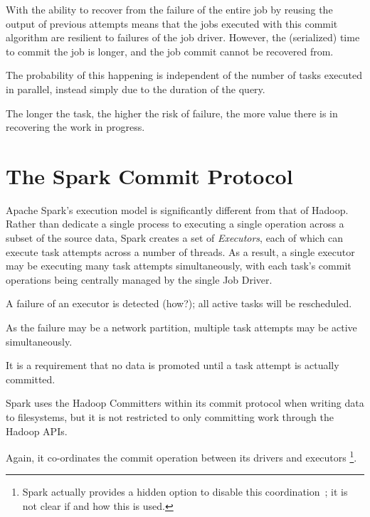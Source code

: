\documentclass[conference]{IEEEtran}
\begin{document}
With the ability to recover from the failure of the entire job by
reusing the output of previous attempts means that the jobs executed
with this commit algorithm are resilient to failures of the job driver.
However, the (serialized) time to commit the job is longer, and the job
commit cannot be recovered from.


The probability of this happening is independent of the number
of tasks executed in parallel, instead simply due to the duration of the query.

The longer the task, the higher the risk of failure, the more value there is
in recovering the work in progress.




\section{The Spark Commit Protocol}
\label{sec:theSparkCommitProtocol}

Apache Spark's execution model is significantly different from
that of Hadoop.
Rather than dedicate a single process to executing a single operation
across a subset of the source data, Spark creates a set of \emph{Executors},
each of which can execute task attempts across a number of threads.
As a result, a single executor may be executing many task attempts
simultaneously, with each task's commit operations being centrally managed
by the single Job Driver.


A failure of an executor is detected (how?);
all active tasks will be rescheduled.

As the failure may be a network partition, multiple task attempts may be active
simultaneously.

It is a requirement that no data is promoted until a task attempt is actually
committed.


Spark uses the Hadoop Committers within its commit protocol when
writing data to filesystems, but it is not restricted to only committing work
through the Hadoop APIs.

Again, it co-ordinates the commit operation between its drivers and executors
\footnote{Spark actually provides a hidden option to disable this
coordination\ \cite{SPARK-8029}; it is not clear if and how this is used.}.



\end{document}
